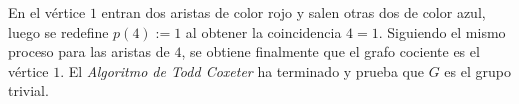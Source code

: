 En el vértice $1$ entran dos aristas de color rojo y salen otras dos de color azul, luego se redefine $p(4):=1$ al obtener la coincidencia $4=1$. Siguiendo el mismo proceso para las aristas de $4$, se obtiene finalmente que el grafo cociente es el vértice $1$. El \textit{Algoritmo de Todd Coxeter} ha terminado y prueba que $G$ es el grupo trivial.


\begin{center}
\end{center}





\blankpage


